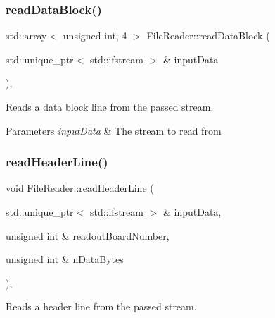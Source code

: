\mbox{\label{class_file_reader_ac578b683eba751027766a2c30f03a28b}} 
\subsubsection{\texorpdfstring{read\+Data\+Block()}{readDataBlock()}}
{\footnotesize\ttfamily std\+::array$<$ unsigned int, 4 $>$ File\+Reader\+::read\+Data\+Block (\begin{DoxyParamCaption}\item[{std\+::unique\+\_\+ptr$<$ std\+::ifstream $>$ \&}]{input\+Data }\end{DoxyParamCaption})\hspace{0.3cm}{\ttfamily [inline]}, {\ttfamily [private]}}



Reads a data block line from the passed stream. 


\begin{DoxyParams}{Parameters}
{\em input\+Data} & The stream to read from \\
\hline
\end{DoxyParams}
\mbox{\label{class_file_reader_a94a71d0a05ececd1e84fa71d80b7e6ba}} 
\subsubsection{\texorpdfstring{read\+Header\+Line()}{readHeaderLine()}}
{\footnotesize\ttfamily void File\+Reader\+::read\+Header\+Line (\begin{DoxyParamCaption}\item[{std\+::unique\+\_\+ptr$<$ std\+::ifstream $>$ \&}]{input\+Data,  }\item[{unsigned int \&}]{readout\+Board\+Number,  }\item[{unsigned int \&}]{n\+Data\+Bytes }\end{DoxyParamCaption})\hspace{0.3cm}{\ttfamily [inline]}, {\ttfamily [private]}}



Reads a header line from the passed stream. 


